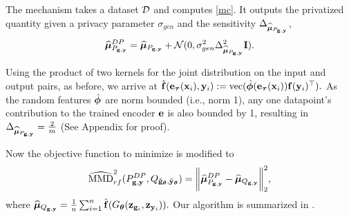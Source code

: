 \documentclass{article}
\begin{document}
\begin{defn}
The mechanism takes a dataset $\mathcal{D}$ and computes \eqref{mc}. It outputs the privatized quantity given a privacy parameter $\sigma_{gen}$ and the sensitivity $\Delta_{\widehat{\mathbf{\bm{\mu}}}_{P_{\mathbf{g}, \mathbf{y}}}}$, 
\begin{align}
\widehat{\mathbf{\bm{\mu}}}^{DP}_{P_{\mathbf{g}, \mathbf{y}}} = \widehat{\mathbf{\bm{\mu}}}_{P_{\mathbf{g}, \mathbf{y}}} + \mathcal{N}(0, \sigma_{gen}^2 \Delta_{\widehat{\mathbf{\bm{\mu}}}_{P_{\mathbf{g}, \mathbf{y}}}}^2 \mathbf{I}). 
\end{align}\label{eq:DP_rfME_image}
\end{defn}\label{defn:DP_mu_P} Using the product of two kernels for the joint distribution on the input and output pairs, as before, we arrive at 
$
\hat{\mathbf{f}}(\mathbf{e}_{\mathbf{\bm{\tau}}}(\mathbf{x}_i), \mathbf{y}_i):= \mbox{vec}(\hat{\mathbf{\bm{\phi}}}(\mathbf{e}_{\mathbf{\bm{\tau}}}(\mathbf{x}_i)) \mathbf{f}(\mathbf{y}_i){^\top}).$ As the random features $\hat{\mathbf{\bm{\phi}}}$ are norm bounded (i.e., norm 1), any one datapoint's contribution to the trained encoder $\mathbf{e}$ is also bounded by 1, resulting in $\Delta_{\widehat{\mathbf{\bm{\mu}}}_{P_{\mathbf{g}, \mathbf{y}}}} = \tfrac{2}{m}$ (See Appendix for proof).

%
Now the objective function to minimize is modified to 
\begin{align}\label{eq:MMD_rf_image_DP}
\widehat{\mathrm{MMD}}_{rf}^{2}(P_{\mathbf{g}, \mathbf{y}}^{DP}, Q_{\tilde{\mathbf{g}}_{\mathbf{\bm{\theta}}}, \tilde{\mathbf{y}}_{\mathbf{\bm{\theta}}}}) = \bigg\|\widehat{\mathbf{\bm{\mu}}}^{DP}_{P_{\mathbf{g}, \mathbf{y}}} -\widehat{\mathbf{\bm{\mu}}}_{Q_{\mathbf{g}, \mathbf{y}}}\bigg\|_{2}^{2},
\end{align} where $  \widehat{\mathbf{\bm{\mu}}}_{Q_{\mathbf{g}, \mathbf{y}}}= \tfrac{1}{n}\sum_{i=1}^{n} \hat{\mathbf{f}}(G_{\mathbf{\bm{\theta}}}(\mathbf{z}_{\mathbf{g}_i}, \mathbf{z}_{\mathbf{y}_i})). $ Our algorithm is summarized in . 


\end{document}
